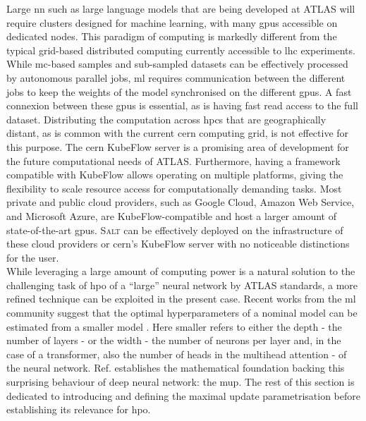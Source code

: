 Large \gls{nn} such as large language models that are being developed at ATLAS will require clusters designed for machine learning, with many \glspl{gpu} accessible on dedicated nodes. This paradigm of computing is markedly different from the typical grid-based distributed computing currently accessible to \gls{lhc} experiments. While \gls{mc}-based samples and sub-sampled datasets can be effectively processed by autonomous parallel jobs, \gls{ml} requires communication between the different jobs to keep the weights of the model synchronised on the different \glspl{gpu}. A fast connexion between these \glspl{gpu} is essential, as is having fast read access to the full dataset. Distributing the computation across \glspl{hpc} that are geographically distant, as is common with the current \gls{cern} computing grid, is not effective for this purpose. The \gls{cern} KubeFlow server is a promising area of development for the future computational needs of ATLAS. Furthermore, having a framework compatible with KubeFlow allows operating on multiple platforms, giving the flexibility to scale resource access for computationally demanding tasks. Most private and public cloud providers, such as Google Cloud, Amazon Web Service, and Microsoft Azure, are KubeFlow-compatible and host a larger amount of state-of-the-art \glspl{gpu}. \textsc{Salt} can be effectively deployed on the infrastructure of these cloud providers or \gls{cern}'s KubeFlow server with no noticeable distinctions for the user. \\

While leveraging a large amount of computing power is a natural solution to the challenging task of \gls{hpo} of a ``large'' neural network by ATLAS standards, a more refined technique can be exploited in the present case. Recent works from the \gls{ml} community suggest that the optimal hyperparameters of a nominal model can be estimated from a smaller model \cite{yang2021tuning}. Here smaller refers to either the depth - the number of layers - or the width - the number of neurons per layer and, in the case of a transformer, also the number of heads in the multihead attention - of the neural network. Ref. \cite{pmlr-v139-yang21c} establishes the mathematical foundation backing this surprising behaviour of deep neural network: the \gls{mup}. The rest of this section is dedicated to introducing and defining the maximal update parametrisation before establishing its relevance for \gls{hpo}. \\

